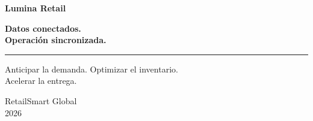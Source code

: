 \documentclass[11pt,a4paper]{article}
\begin{document}
\hypersetup{pageanchor=false}
\begin{titlepage}
\centering
\vspace*{18mm}
{\fontsize{40}{46}\selectfont\bfseries Lumina Retail\par}
\vspace{9mm}
{\fontsize{20}{31}\selectfont\bfseries
Datos conectados.\\[2mm]
Operación sincronizada.\par}
\vspace{7mm}
{\color{acento}\rule{35mm}{.7pt}\par}
\vspace{7mm}
{\fontsize{16}{20}\selectfont
Anticipar la demanda. Optimizar el inventario.\\
Acelerar la entrega.\par}
\vspace{2mm}
\resizebox{1\textwidth}{!}{\LuminaPortada}
\vfill
{\normalsize RetailSmart Global\\2026\par}
\vspace*{8mm}
\end{titlepage}

\hypersetup{pageanchor=true}
\clearpage
\end{document}

